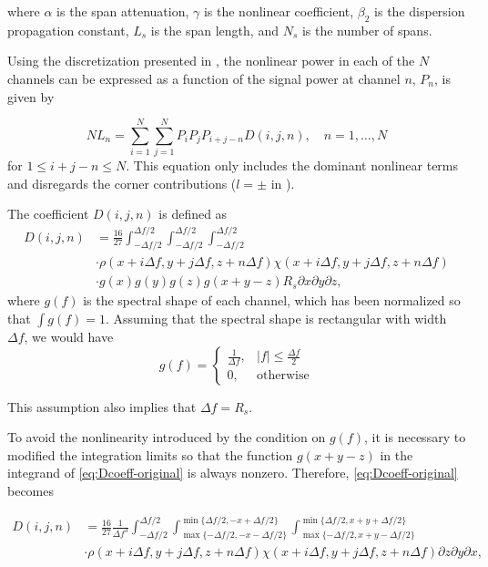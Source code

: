 \documentclass[a4paper]{article}
\begin{document}
\noindent where $\alpha$ is the span attenuation, $\gamma$ is the nonlinear coefficient, $\beta_2$ is the dispersion propagation constant, $L_s$ is the span length, and $N_s$ is the number of spans.

Using the discretization presented in \cite{Roberts2016}, the nonlinear power in each of the $N$ channels can be expressed as a function of the signal power at channel $n$, $P_n$, is given by

\begin{equation}
	NL_n = \sum_{i = 1}^{N}\sum_{j = 1}^NP_iP_jP_{i+j-n}D(i, j, n), \quad n = 1, \ldots, N
\end{equation}
for $1 \leq i+j-n \leq N$. This equation only includes the dominant nonlinear terms and disregards the corner contributions ($l = \pm$ in \cite{Roberts2016}).

The coefficient $D(i, j, n)$ is defined as
\begin{align} \label{eq:Dcoeff-original}\nonumber 
	D(i, j, n) &= \frac{16}{27}\int_{-\Delta f/2}^{\Delta f/2}\int_{-\Delta f/2}^{\Delta f/2}\int_{-\Delta f/2}^{\Delta f/2} \\ \nonumber
	&\cdot\rho(x + i\Delta f, y + j\Delta f, z + n\Delta f)\chi(x + i\Delta f, y + j\Delta f, z + n\Delta f) \\
	&\cdot g(x)g(y)g(z)g(x+y-z)R_s\partial x\partial y\partial z,
\end{align}
where $g(f)$ is the spectral shape of each channel, which has been normalized so that $\int g(f) = 1$. Assuming that the spectral shape is rectangular with width $\Delta f$, we would have
\begin{equation}
	g(f) = \begin{cases}
	\frac{1}{\Delta f}, & |f| \leq \frac{\Delta f}{2} \\
	0, & \text{otherwise}
	\end{cases}
\end{equation} 

This assumption also implies that $\Delta f = R_s$.

To avoid the nonlinearity introduced by the condition on $g(f)$, it is necessary to modified the integration limits so that the function $g(x+y-z)$ in the integrand of \eqref{eq:Dcoeff-original} is always nonzero. Therefore, \eqref{eq:Dcoeff-original} becomes

\begin{align} \label{eq:Dcoeff}\nonumber 
D(i, j, n) &= \frac{16}{27}\frac{1}{\Delta f^3}\int_{-\Delta f/2}^{\Delta f/2}\int_{\max\{-\Delta f/2, -x-\Delta f/2\}}^{\min\{\Delta f/2, -x+\Delta f/2\}}\int_{\max\{-\Delta f/2, x+y-\Delta f/2\}}^{\min\{\Delta f/2, x+y+\Delta f/2\}} \\
&\cdot\rho(x + i\Delta f, y + j\Delta f, z + n\Delta f)\chi(x + i\Delta f, y + j\Delta f, z + n\Delta f)\partial z\partial y\partial x,
\end{align}
\end{document}
